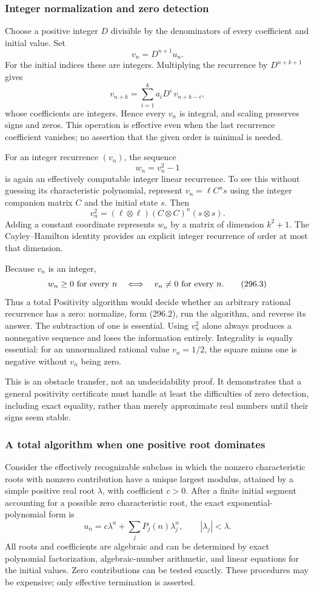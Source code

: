 \documentclass[11pt]{article}
\begin{document}
\subsubsection{Integer normalization and zero detection}
Choose a positive integer $D$ divisible by the denominators of every coefficient and initial value. Set
\[
 v_n=D^{n+1}u_n.
\]
For the initial indices these are integers. Multiplying the recurrence by $D^{n+k+1}$ gives
\[
 v_{n+k}=\sum_{i=1}^k a_iD^i\,v_{n+k-i},
 \tag{296.1}
\]
whose coefficients are integers. Hence every $v_n$ is integral, and scaling preserves signs and zeros. This operation is effective even when the last recurrence coefficient vanishes; no assertion that the given order is minimal is needed.

For an integer recurrence $(v_n)$, the sequence
\[
 w_n=v_n^2-1
 \tag{296.2}
\]
is again an effectively computable integer linear recurrence. To see this without guessing its characteristic polynomial, represent
$v_n=\ell C^n s$ using the integer companion matrix $C$ and the initial state $s$. Then
\[
 v_n^2=(\ell\otimes\ell)(C\otimes C)^n(s\otimes s).
\]
Adding a constant coordinate represents $w_n$ by a matrix of dimension $k^2+1$. The Cayley--Hamilton identity provides an explicit integer recurrence of order at most that dimension.

Because $v_n$ is an integer,
\[
 w_n\ge0\ \hbox{for every }n
 \quad\Longleftrightarrow\quad
 v_n\ne0\ \hbox{for every }n.
 \tag{296.3}
\]
Thus a total Positivity algorithm would decide whether an arbitrary rational recurrence has a zero: normalize, form (296.2), run the algorithm, and reverse its answer. The subtraction of one is essential. Using $v_n^2$ alone always produces a nonnegative sequence and loses the information entirely. Integrality is equally essential: for an unnormalized rational value $v_n=1/2$, the square minus one is negative without $v_n$ being zero.

This is an obstacle transfer, not an undecidability proof. It demonstrates that a general positivity certificate must handle at least the difficulties of zero detection, including exact equality, rather than merely approximate real numbers until their signs seem stable.

\subsubsection{A total algorithm when one positive root dominates}
Consider the effectively recognizable subclass in which the nonzero characteristic roots with nonzero contribution have a unique largest modulus, attained by a simple positive real root $\lambda$, with coefficient $c>0$. After a finite initial segment accounting for a possible zero characteristic root, the exact exponential-polynomial form is
\[
 u_n=c\lambda^n+\sum_j P_j(n)\lambda_j^n,\qquad
 |\lambda_j|<\lambda.
 \tag{296.4}
\]
All roots and coefficients are algebraic and can be determined by exact polynomial factorization, algebraic-number arithmetic, and linear equations for the initial values. Zero contributions can be tested exactly. These procedures may be expensive; only effective termination is asserted.
\end{document}
